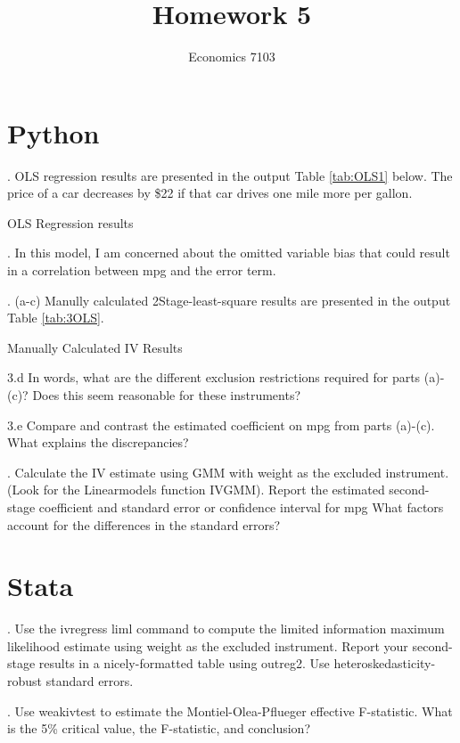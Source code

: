 \documentclass{article}
\title{Homework 5}
\author{Economics 7103}
\begin{document}
  
\maketitle

\section{Python}
. OLS regression results are presented in the output Table \ref{tab:OLS1} below. The price of a car decreases by \$22 if that car drives one mile more per gallon. 

\begin{table}[h]
    \centering
    
    \caption{OLS Regression results}
    \label{tab:OLS1}
\end{table}

. In this model, I am concerned about the omitted variable bias that could result in a correlation between mpg and the error term.

\clearpage

. (a-c) Manully calculated 2Stage-least-square results are presented in the output Table \ref{tab:3OLS}. 

\begin{table}[h]
    \centering
    
    \caption{Manually Calculated IV Results}
    \label{tab:3OLS}
\end{table}

\noindent 3.d In words, what are the different exclusion restrictions required for parts (a)-(c)? Does this seem reasonable for these instruments?


\noindent 3.e Compare and contrast the estimated coefficient on mpg from parts (a)-(c). What explains the discrepancies?

. Calculate the IV estimate using GMM with weight as the excluded instrument. (Look for the Linearmodels function IVGMM). Report the estimated second-stage coefficient and standard error or confidence interval for mpg What factors account for the differences in the standard errors?


\section{Stata}

. Use the ivregress liml command to compute the limited information maximum likelihood estimate using weight as the excluded instrument. Report your second-stage results in a nicely-formatted table using outreg2. Use heteroskedasticity-robust standard errors.


. Use weakivtest to estimate the Montiel-Olea-Pflueger effective F-statistic. What is the 5\% critical value, the F-statistic, and conclusion?
\end{document}
